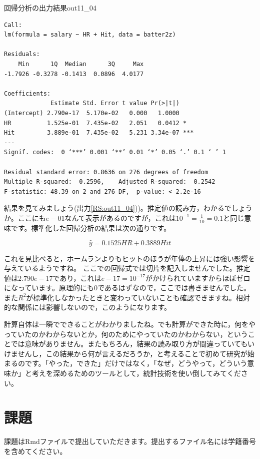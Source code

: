 \documentclass{ltjbook}
\begin{document}
\begin{Rscreen}{回帰分析の出力結果}{out11_04}
\begin{verbatim}
Call:
lm(formula = salary ~ HR + Hit, data = batter2z)

Residuals:
    Min      1Q  Median      3Q     Max 
-1.7926 -0.3278 -0.1413  0.0896  4.0177 

Coefficients:
             Estimate Std. Error t value Pr(>|t|)    
(Intercept) 2.790e-17  5.170e-02   0.000   1.0000    
HR          1.525e-01  7.435e-02   2.051   0.0412 *  
Hit         3.889e-01  7.435e-02   5.231 3.34e-07 ***
---
Signif. codes:  0 ‘***’ 0.001 ‘**’ 0.01 ‘*’ 0.05 ‘.’ 0.1 ‘ ’ 1

Residual standard error: 0.8636 on 276 degrees of freedom
Multiple R-squared:  0.2596,	Adjusted R-squared:  0.2542 
F-statistic: 48.39 on 2 and 276 DF,  p-value: < 2.2e-16
\end{verbatim}
\end{Rscreen}

結果を見てみましょう(出力\ref{RS:out11_04}))。推定値の読み方，わかるでしょうか。ここにも$e-01$なんて表示があるのですが，これは$10^{-1}=\frac{1}{10}=0.1$と同じ意味です。標準化した回帰分析の結果は次の通りです。

\[ \hat{y} = 0.1525 HR + 0.3889 Hit \]

これを見比べると，ホームランよりもヒットのほうが年俸の上昇には強い影響を与えているようですね。
ここでの回帰式では切片を記入しませんでした。推定値は$2.790e-17$であり，これは$e-17=10^{-17}$がかけられていますからほぼゼロになっています。原理的にも$0$であるはずなので，ここでは書きませんでした。
また$R^2$が標準化しなかったときと変わっていないことも確認できますね。相対的な関係には影響しないので，このようになります。

計算自体は一瞬でできることがわかりましたね。でも計算ができた時に，何をやっていたのかわからないとか，何のためにやっていたのかわからない，ということでは意味がありません。またもちろん，結果の読み取り方が間違っていてもいけませんし，この結果から何が言えるだろうか，と考えることで初めて研究が始まるのです。「やった，できた」だけではなく，「なぜ，どうやって，どういう意味か」と考えを深めるためのツールとして，統計技術を使い倒してみてください。

\section{課題}
課題はRmdファイルで提出していただきます。提出するファイル名には学籍番号を含めてください。
\end{document}
